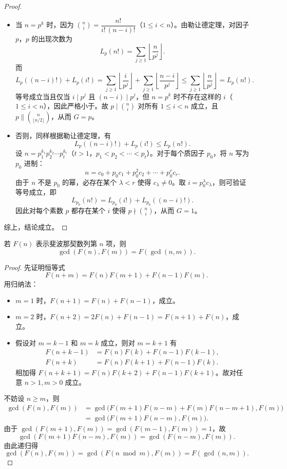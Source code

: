 \begin{proof}
\begin{itemize}
\item 当 $n = p^k$ 时，因为 $\binom{n}{i} = \dfrac{n!}{i!\,(n-i)!}$（$1 \le i < n$）。由勒让德定理，对因子 $p$，$p$ 的出现次数为
\[
L_p(n!) = \sum_{j \ge 1}\left\lfloor\frac{n}{p^j}\right\rfloor.
\]
而
\[
L_p((n-i)!) + L_p(i!) = \sum_{j \ge 1}\left\lfloor\frac{i}{p^j}\right\rfloor + \sum_{j \ge 1}\left\lfloor\frac{n-i}{p^j}\right\rfloor
\le \sum_{j \ge 1}\left\lfloor\frac{n}{p^j}\right\rfloor = L_p(n!).
\]
等号成立当且仅当 $i \mid p^j$ 且 $(n-i) \mid p^j$，但 $n = p^k$ 时不存在这样的 $i$（$1 \le i < n$），因此严格小于。故 $p \mid \binom{n}{i}$ 对所有 $1 \le i < n$ 成立，且 $p \parallel \binom{n}{\lfloor n/2\rfloor}$，从而 $G = p$。

\item 否则，同样根据勒让德定理，有
\[
L_p((n-i)!) + L_p(i!) \le L_p(n!).
\]
设 $n = p_1^{k_1}p_2^{k_2}\cdots p_t^{k_t}$（$t>1$，$p_1<p_2<\cdots<p_t$）。对于每个质因子 $p_0$，将 $n$ 写为 $p_0$ 进制：
\[
n = c_0 + p_0c_1 + p_0^2c_2 + \cdots + p_0^r c_r.
\]
由于 $n$ 不是 $p_0$ 的幂，必存在某个 $\lambda < r$ 使得 $c_\lambda \neq 0$。取 $i = p_0^\lambda c_\lambda$，则可验证等号成立，即
\[
L_{p_0}(n!) = L_{p_0}(i!) + L_{p_0}((n-i)!).
\]
因此对每个素数 $p$ 都存在某个 $i$ 使得 $p \nmid \binom{n}{i}$，从而 $G = 1$。
\end{itemize}
综上，结论成立。
\end{proof}

\begin{theorem}
若 $F(n)$ 表示斐波那契数列第 $n$ 项，则
\[
\gcd(F(n), F(m)) = F(\gcd(n, m)).
\]
\end{theorem}

\begin{proof}
先证明恒等式
\[
F(n+m) = F(n)F(m+1) + F(n-1)F(m).
\]
用归纳法：
\begin{itemize}
\item $m=1$ 时，$F(n+1)=F(n)+F(n-1)$，成立。
\item $m=2$ 时，$F(n+2)=2F(n)+F(n-1)=F(n+1)+F(n)$，成立。
\item 假设对 $m=k-1$ 和 $m=k$ 成立，则对 $m=k+1$ 有
\[
\begin{aligned}
F(n+k-1) &= F(n)F(k) + F(n-1)F(k-1),\\
F(n+k) &= F(n)F(k+1) + F(n-1)F(k).
\end{aligned}
\]
相加得 $F(n+k+1)=F(n)F(k+2)+F(n-1)F(k+1)$。故对任意 $n>1,m>0$ 成立。
\end{itemize}
不妨设 $n \ge m$，则
\[
\begin{aligned}
\gcd(F(n),F(m)) &= \gcd\bigl(F(m+1)F(n-m)+F(m)F(n-m+1),F(m)\bigr)\\
&= \gcd\bigl(F(m+1)F(n-m),F(m)\bigr).
\end{aligned}
\]
由于 $\gcd(F(m+1),F(m)) = \gcd(F(m-1),F(m)) = 1$，故
\[
\gcd(F(m+1)F(n-m),F(m)) = \gcd(F(n-m),F(m)).
\]
由此递归得
\[
\gcd(F(n),F(m)) = \gcd(F(n \bmod m),F(m)) = F(\gcd(n,m)).
\]
\end{proof}

